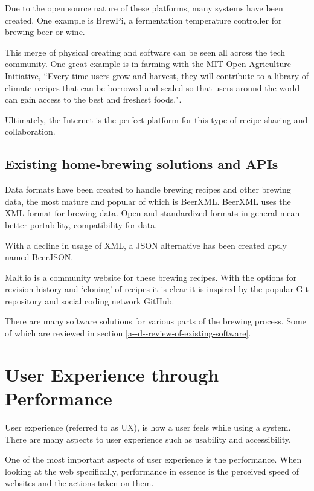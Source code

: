 Due to the open source nature of these platforms, many systems have been created. One example is BrewPi, a fermentation temperature controller for brewing beer or wine. \cite{brewpi}

This merge of physical creating and software can be seen all across the tech community. One great example is in farming with the MIT Open Agriculture Initiative, ``Every time users grow and harvest, they will contribute to a library of climate recipes that can be borrowed and scaled so that users around the world can gain access to the best and freshest foods.". \cite{climate_recipes}

Ultimately, the Internet is the perfect platform for this type of recipe sharing and collaboration.

\subsection{Existing home-brewing solutions and APIs} \label{l-r--exisiting-home-brewing-solutions}

Data formats have been created to handle brewing recipes and other brewing data, the most mature and popular of which is BeerXML. BeerXML uses the XML format for brewing data. \cite{beerxml} Open and standardized formats in general mean better portability, compatibility for data. %

With a decline in usage of XML, a JSON alternative has been created aptly named BeerJSON. \cite{beerjson} %

Malt.io is a community website for these brewing recipes. With the options for revision history and `cloning' of recipes it is clear it is inspired by the popular Git repository and social coding network GitHub. \cite{malt.io}

There are many software solutions for various parts of the brewing process. Some of which are reviewed in section \ref{a--d--review-of-existing-software}.

\section{User Experience through Performance} \label{l-r--user-experience-performance}

User experience (referred to as UX), is how a user feels while using a system. There are many aspects to user experience such as usability and accessibility. \cite{what_is_ux}

One of the most important aspects of user experience is the performance. When looking at the web specifically, performance in essence is the perceived speed of websites and the actions taken on them.

